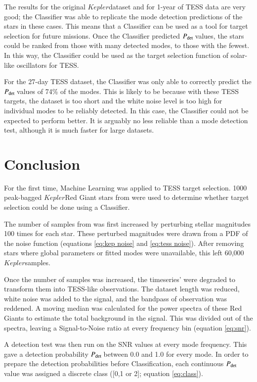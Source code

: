 \documentclass[a4paper,fleqn,usenatbib,useAMS]{mnras}
\newcommand{\kep}{\ensuremath{Kepler}\:}
\newcommand{\pdet}{\ensuremath{P_{\rm det}\:}}
\begin{document}
The results for the original \kep dataset and for 1-year of TESS data are very good; the Classifier was able to replicate the mode detection predictions of the stars in these cases. This means that a Classifier can be used as a tool for target selection for future missions. Once the Classifier predicted \pdet values, the stars could be ranked from those with many detected modes, to those with the fewest. In this way, the Classifier could be used as the target selection function of solar-like oscillators for TESS. 

For the 27-day TESS dataset, the Classifier was only able to correctly predict the \pdet values of 74\% of the modes. This is likely to be because with these TESS targets, the dataset is too short and the white noise level is too high for individual modes to be reliably detected. In this case, the Classifier could not be expected to perform better. It is arguably no less reliable than a mode detection test, although it is much faster for large datasets. 




\section{Conclusion}
\label{sect: conc}

For the first time, Machine Learning was applied to TESS target selection. 1000 peak-bagged \kep Red Giant stars from \citet{davies_asteroseismology_2016} were used to determine whether target selection could be done using a Classifier.

The number of samples from \citet{davies_asteroseismology_2016} was first increased by perturbing stellar magnitudes 100 times for each star. These perturbed magnitudes were drawn from a PDF of the noise function (equations \ref{eq:kep noise} and \ref{eq:tess noise}). After removing stars where global parameters or fitted modes were unavailable, this left 60,000 \kep samples. 

Once the number of samples was increased, the timeseries' were degraded to transform them into TESS-like observations. The dataset length was reduced, white noise was added to the signal, and the bandpass of observation was reddened. A moving median was calculated for the power spectra of these Red Giants to estimate the total background in the signal. This was divided out of the spectra, leaving a Signal-to-Noise ratio at every frequency bin (equation \ref{eq:snr}).

A detection test was then run on the SNR values at every mode frequency. This gave a detection probability \pdet between 0.0 and 1.0 for every mode. In order to prepare the detection probabilities before Classification, each continuous \pdet value was assigned a discrete class ([0,1 or 2]; equation \ref{eq:class}).
\end{document}
